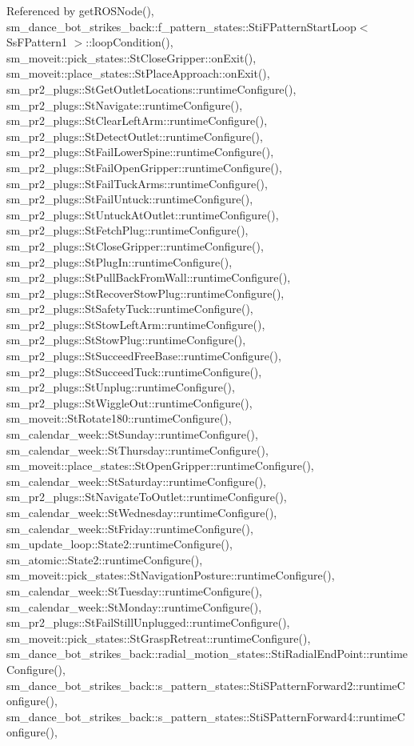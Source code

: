 Referenced by get\+R\+O\+S\+Node(), sm\+\_\+dance\+\_\+bot\+\_\+strikes\+\_\+back\+::f\+\_\+pattern\+\_\+states\+::\+Sti\+F\+Pattern\+Start\+Loop$<$ Ss\+F\+Pattern1 $>$\+::loop\+Condition(), sm\+\_\+moveit\+::pick\+\_\+states\+::\+St\+Close\+Gripper\+::on\+Exit(), sm\+\_\+moveit\+::place\+\_\+states\+::\+St\+Place\+Approach\+::on\+Exit(), sm\+\_\+pr2\+\_\+plugs\+::\+St\+Get\+Outlet\+Locations\+::runtime\+Configure(), sm\+\_\+pr2\+\_\+plugs\+::\+St\+Navigate\+::runtime\+Configure(), sm\+\_\+pr2\+\_\+plugs\+::\+St\+Clear\+Left\+Arm\+::runtime\+Configure(), sm\+\_\+pr2\+\_\+plugs\+::\+St\+Detect\+Outlet\+::runtime\+Configure(), sm\+\_\+pr2\+\_\+plugs\+::\+St\+Fail\+Lower\+Spine\+::runtime\+Configure(), sm\+\_\+pr2\+\_\+plugs\+::\+St\+Fail\+Open\+Gripper\+::runtime\+Configure(), sm\+\_\+pr2\+\_\+plugs\+::\+St\+Fail\+Tuck\+Arms\+::runtime\+Configure(), sm\+\_\+pr2\+\_\+plugs\+::\+St\+Fail\+Untuck\+::runtime\+Configure(), sm\+\_\+pr2\+\_\+plugs\+::\+St\+Untuck\+At\+Outlet\+::runtime\+Configure(), sm\+\_\+pr2\+\_\+plugs\+::\+St\+Fetch\+Plug\+::runtime\+Configure(), sm\+\_\+pr2\+\_\+plugs\+::\+St\+Close\+Gripper\+::runtime\+Configure(), sm\+\_\+pr2\+\_\+plugs\+::\+St\+Plug\+In\+::runtime\+Configure(), sm\+\_\+pr2\+\_\+plugs\+::\+St\+Pull\+Back\+From\+Wall\+::runtime\+Configure(), sm\+\_\+pr2\+\_\+plugs\+::\+St\+Recover\+Stow\+Plug\+::runtime\+Configure(), sm\+\_\+pr2\+\_\+plugs\+::\+St\+Safety\+Tuck\+::runtime\+Configure(), sm\+\_\+pr2\+\_\+plugs\+::\+St\+Stow\+Left\+Arm\+::runtime\+Configure(), sm\+\_\+pr2\+\_\+plugs\+::\+St\+Stow\+Plug\+::runtime\+Configure(), sm\+\_\+pr2\+\_\+plugs\+::\+St\+Succeed\+Free\+Base\+::runtime\+Configure(), sm\+\_\+pr2\+\_\+plugs\+::\+St\+Succeed\+Tuck\+::runtime\+Configure(), sm\+\_\+pr2\+\_\+plugs\+::\+St\+Unplug\+::runtime\+Configure(), sm\+\_\+pr2\+\_\+plugs\+::\+St\+Wiggle\+Out\+::runtime\+Configure(), sm\+\_\+moveit\+::\+St\+Rotate180\+::runtime\+Configure(), sm\+\_\+calendar\+\_\+week\+::\+St\+Sunday\+::runtime\+Configure(), sm\+\_\+calendar\+\_\+week\+::\+St\+Thursday\+::runtime\+Configure(), sm\+\_\+moveit\+::place\+\_\+states\+::\+St\+Open\+Gripper\+::runtime\+Configure(), sm\+\_\+calendar\+\_\+week\+::\+St\+Saturday\+::runtime\+Configure(), sm\+\_\+pr2\+\_\+plugs\+::\+St\+Navigate\+To\+Outlet\+::runtime\+Configure(), sm\+\_\+calendar\+\_\+week\+::\+St\+Wednesday\+::runtime\+Configure(), sm\+\_\+calendar\+\_\+week\+::\+St\+Friday\+::runtime\+Configure(), sm\+\_\+update\+\_\+loop\+::\+State2\+::runtime\+Configure(), sm\+\_\+atomic\+::\+State2\+::runtime\+Configure(), sm\+\_\+moveit\+::pick\+\_\+states\+::\+St\+Navigation\+Posture\+::runtime\+Configure(), sm\+\_\+calendar\+\_\+week\+::\+St\+Tuesday\+::runtime\+Configure(), sm\+\_\+calendar\+\_\+week\+::\+St\+Monday\+::runtime\+Configure(), sm\+\_\+pr2\+\_\+plugs\+::\+St\+Fail\+Still\+Unplugged\+::runtime\+Configure(), sm\+\_\+moveit\+::pick\+\_\+states\+::\+St\+Grasp\+Retreat\+::runtime\+Configure(), sm\+\_\+dance\+\_\+bot\+\_\+strikes\+\_\+back\+::radial\+\_\+motion\+\_\+states\+::\+Sti\+Radial\+End\+Point\+::runtime\+Configure(), sm\+\_\+dance\+\_\+bot\+\_\+strikes\+\_\+back\+::s\+\_\+pattern\+\_\+states\+::\+Sti\+S\+Pattern\+Forward2\+::runtime\+Configure(), sm\+\_\+dance\+\_\+bot\+\_\+strikes\+\_\+back\+::s\+\_\+pattern\+\_\+states\+::\+Sti\+S\+Pattern\+Forward4\+::runtime\+Configure(), 
